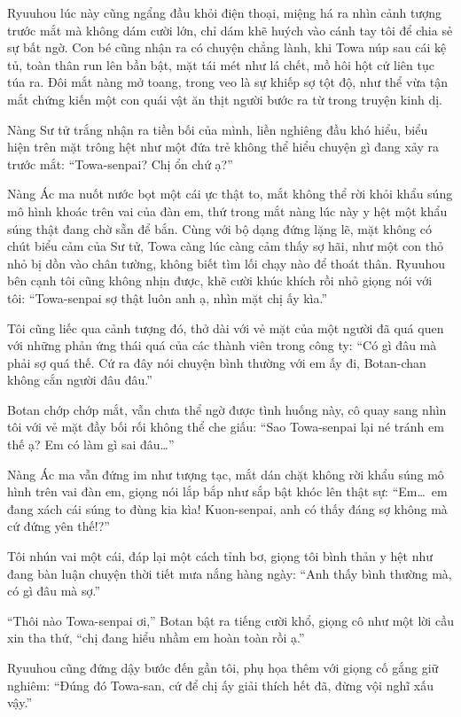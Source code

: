 \documentclass[../main.tex]{subfiles}
\begin{document}
Ryuuhou lúc này cũng ngẩng đầu khỏi điện thoại, miệng há ra nhìn cảnh tượng trước mắt mà không dám cười lớn, chỉ dám khẽ huých vào cánh tay tôi để chia sẻ sự bất ngờ. Con bé cũng nhận ra có chuyện chẳng lành, khi Towa núp sau cái kệ tủ, toàn thân run lên bần bật, mặt tái mét như lá chết, mồ hôi hột cứ liên tục túa ra. Đôi mắt nàng mở toang, trong veo là sự khiếp sợ tột độ, như thể vừa tận mắt chứng kiến một con quái vật ăn thịt người bước ra từ trong truyện kinh dị.

Nàng Sư tử trắng nhận ra tiền bối của mình, liền nghiêng đầu khó hiểu, biểu hiện trên mặt trông hệt như một đứa trẻ không thể hiểu chuyện gì đang xảy ra trước mắt: ``Towa-senpai? Chị ổn chứ ạ?''


Nàng Ác ma nuốt nước bọt một cái ực thật to, mắt không thể rời khỏi khẩu súng mô hình khoác trên vai của đàn em, thứ trong mắt nàng lúc này y hệt một khẩu súng thật đang chờ sẵn để bắn. Cùng với bộ dạng đứng lặng lẽ, mặt không có chút biểu cảm của Sư tử, Towa càng lúc càng cảm thấy sợ hãi, như một con thỏ nhỏ bị dồn vào chân tường, không biết tìm lối chạy nào để thoát thân. Ryuuhou bên cạnh tôi cũng không nhịn được, khẽ cười khúc khích rồi nhỏ giọng nói với tôi: ``Towa-senpai sợ thật luôn anh ạ, nhìn mặt chị ấy kìa.''

Tôi cũng liếc qua cảnh tượng đó, thở dài với vẻ mặt của một người đã quá quen với những phản ứng thái quá của các thành viên trong công ty: ``Có gì đâu mà phải sợ quá thế. Cứ ra đây nói chuyện bình thường với em ấy đi, Botan-chan không cắn người đâu đâu.''

Botan chớp chớp mắt, vẫn chưa thể ngờ được tình huống này, cô quay sang nhìn tôi với vẻ mặt đầy bối rối không thể che giấu: ``Sao Towa-senpai lại né tránh em thế ạ? Em có làm gì sai đâu\dots''

Nàng Ác ma vẫn đứng im như tượng tạc, mắt dán chặt không rời khẩu súng mô hình trên vai đàn em, giọng nói lắp bắp như sắp bật khóc lên thật sự: ``Em\dots\ em đang xách cái súng to đùng kia kìa! Kuon-senpai, anh có thấy đáng sợ không mà cứ đứng yên thế!?''

Tôi nhún vai một cái, đáp lại một cách tỉnh bơ, giọng tôi bình thản y hệt như đang bàn luận chuyện thời tiết mưa nắng hàng ngày: ``Anh thấy bình thường mà, có gì đâu mà sợ.''

``Thôi nào Towa-senpai ơi,'' Botan bật ra tiếng cười khổ, giọng cô như một lời cầu xin tha thứ, ``chị đang hiểu nhầm em hoàn toàn rồi ạ.''

Ryuuhou cũng đứng dậy bước đến gần tôi, phụ họa thêm với giọng cố gắng giữ nghiêm: ``Đúng đó Towa-san, cứ để chị ấy giải thích hết đã, đừng vội nghĩ xấu vậy.''
\end{document}
